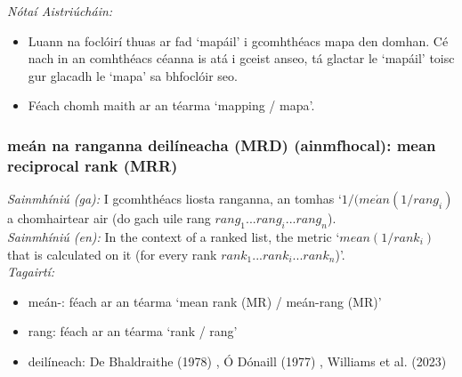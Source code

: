 \noindent \textit{Nótaí Aistriúcháin:}
\begin{itemize}
	\item Luann na foclóirí thuas ar fad `mapáil' i gcomhthéacs mapa den domhan. Cé nach in an comhthéacs céanna is atá i gceist anseo, tá glactar le `mapáil' toisc gur glacadh le `mapa' sa bhfoclóir seo.
	\item Féach chomh maith ar an téarma `mapping / mapa'.
\end{itemize}


\subsubsection*{meán na ranganna deilíneacha (MRD) (ainmfhocal): mean reciprocal rank (MRR)}
 \noindent \textit{Sainmhíniú (ga):} I gcomhthéacs liosta ranganna, an tomhas `$1 / (me\acute{a}n(1 / rang_i)$ a chomhairtear air (do gach uile rang $rang_1...rang_i...rang_n$).
\\
 \noindent \textit{Sainmhíniú (en):} In the context of a ranked list, the metric `$mean(1 / rank_i)$ that is calculated on it (for every rank $rank_1...rank_i...rank_n$)'.
\\
 \noindent \textit{Tagairtí:}
\begin{itemize}
	\item meán-: féach ar an téarma `mean rank (MR) / meán-rang (MR)'
	\item rang: féach ar an téarma `rank / rang'
	\item deilíneach: De Bhaldraithe (1978) \cite{de-bhaldraithe}, Ó Dónaill (1977) \cite{odonaill}, Williams et al. (2023) \cite{storchiste}
\end{itemize}

